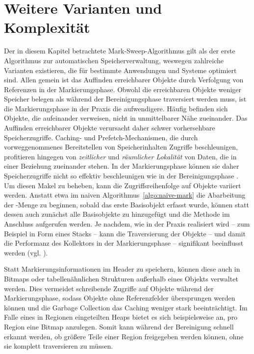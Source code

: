 
\section{Weitere Varianten und Komplexität}
\label{sec:mark-sweep-variations}

Der in diesem Kapitel betrachtete Mark-Sweep-Algorithmus gilt als der erste Algorithmus zur automatischen Speicherverwaltung, weswegen zahlreiche Varianten existieren, die für bestimmte Anwendungen und Systeme optimiert sind.
Allen gemein ist das Auffinden erreichbarer Objekte durch Verfolgung von Referenzen in der Markierungsphase.
Obwohl die erreichbaren Objekte weniger Speicher belegen als während der Bereinigungsphase traversiert werden muss, ist die Markierungsphase in der Praxis die aufwendigere.
Häufig befinden sich Objekte, die aufeinander verweisen, nicht in unmittelbarer Nähe zueinander.
Das Auffinden erreichbarer Objekte verursacht daher schwer vorhersehbare Speicherzugriffe.
Caching- und Prefetch-Mechanismen, die durch vorweggenommenes Bereitstellen von Speicherinhalten Zugriffe beschleunigen, profitieren hingegen von \textit{zeitlicher} und \textit{räumlicher Lokalität} von Daten, die in einer Beziehung zueinander stehen.
In der Markierungsphase können sie daher Speicherzugriffe nicht so effektiv beschleunigen wie in der Bereinigungsphase \cite[S. 21f]{handbook}.
Um diesen Makel zu beheben, kann die Zugriffsreihenfolge auf Objekte variiert werden.
Anstatt etwa im naiven Algorithmus~\ref{algo:naive-mark} die Abarbeitung der -Menge zu beginnen, sobald das erste Basisobjekt erfasst wurde, können statt dessen auch zunächst alle Basisobjekte zu  hinzugefügt und die Methode  im Anschluss aufgerufen werden.
Je nachdem, wie  in der Praxis realisiert wird -- zum Beispiel in Form eines Stacks -- kann die Traversierung der Objekte -- und damit die Performanz des Kollektors in der Markierungsphase -- signifikant beeinflusst werden (vgl. \cite[S. 19]{handbook}).

Statt Markierungsinformationen im Header zu speichern, können diese auch in Bitmaps oder tabellenähnlichen Strukturen außerhalb eines Objekts verwaltet werden.
Dies vermeidet schreibende Zugriffe auf Objekte während der Markierungsphase, sodass Objekte ohne Referenzfelder übersprungen werden können und die Garbage Collection das Caching weniger stark beeinträchtigt.
Im Falle eines in Regionen eingeteilten Heaps bietet es sich beispielsweise an, pro Region eine Bitmap anzulegen.
Somit kann während der Bereinigung schnell erkannt werden, ob größere Teile einer Region freigegeben werden können, ohne sie komplett traversieren zu müssen.

